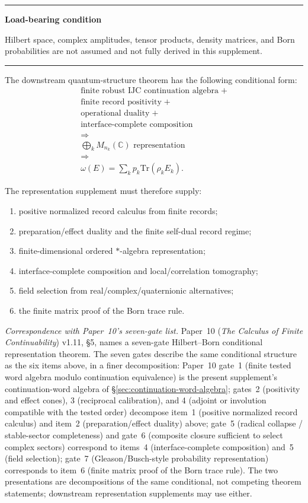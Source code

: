 \documentclass[11pt]{article}
\newcommand{\C}{\mathbb C}
\newenvironment{warningbox}{\par\medskip\hrule\vspace{0.4em}\textbf{Load-bearing condition}\par\vspace{0.3em}}{\vspace{0.5em}\hrule\par\medskip}
\begin{document}
\begin{warningbox}
Hilbert space, complex amplitudes, tensor products, density matrices, and Born probabilities are not assumed and not fully derived in this supplement.
\end{warningbox}

The downstream quantum-structure theorem has the following conditional form:
\[
\begin{gathered}
\text{finite robust IJC continuation algebra}\;+ \\
\text{finite record positivity}\;+ \\
\text{operational duality}\;+ \\
\text{interface-complete composition} \\
\Longrightarrow \\
\bigoplus_k M_{n_k}(\C)\text{ representation} \\
\Longrightarrow \\
\omega(E)=\sum_k p_k\mathrm{Tr}(\rho_k E_k).
\end{gathered}
\]

The representation supplement must therefore supply:
\begin{enumerate}[leftmargin=2em]
\item positive normalized record calculus from finite records;
\item preparation/effect duality and the finite self-dual record regime;
\item finite-dimensional ordered $*$-algebra representation;
\item interface-complete composition and local/correlation tomography;
\item field selection from real/complex/quaternionic alternatives;
\item the finite matrix proof of the Born trace rule.
\end{enumerate}

\medskip
\noindent\textit{Correspondence with Paper~10's seven-gate list.}\quad
Paper~10 (\emph{The Calculus of Finite Continuability}) v1.11, \S5, names a seven-gate Hilbert--Born conditional representation theorem.  The seven gates describe the same conditional structure as the six items above, in a finer decomposition: Paper~10 gate~1 (finite tested word algebra modulo continuation equivalence) is the present supplement's continuation-word algebra of \S\ref{sec:continuation-word-algebra}; gates~2 (positivity and effect cones), 3 (reciprocal calibration), and 4 (adjoint or involution compatible with the tested order) decompose item~1 (positive normalized record calculus) and item~2 (preparation/effect duality) above; gate~5 (radical collapse / stable-sector completeness) and gate~6 (composite closure sufficient to select complex sectors) correspond to items~4 (interface-complete composition) and~5 (field selection); gate~7 (Gleason/Busch-style probability representation) corresponds to item~6 (finite matrix proof of the Born trace rule).  The two presentations are decompositions of the same conditional, not competing theorem statements; downstream representation supplements may use either.
\end{document}
